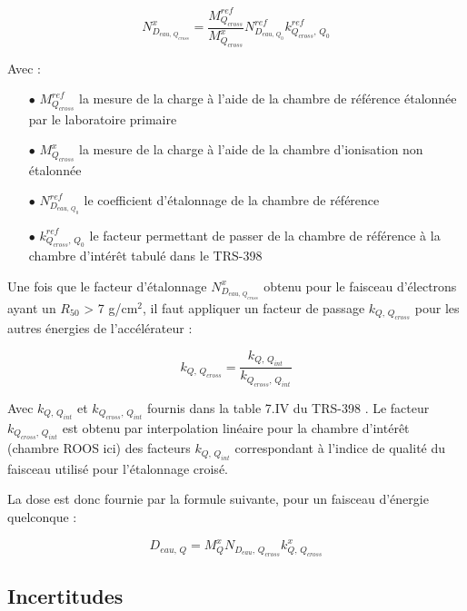 \documentclass{article}
\begin{document}
\begin{equation}
  N_{D_{eau, \, Q_{cross}}}^x = \dfrac{M_{Q_{cross}}^{ref}}{M_{Q_{cross}}^x} N_{D_{eau,\, Q_0}}^{ref} k_{Q_{cross},\, Q_0}^{ref}
  \label{eq_cross_calib}
\end{equation}

Avec :

\begin{itemize}
  \item[$\bullet$] $M_{Q_{cross}}^{ref}$ la mesure de la charge à l'aide de la chambre de référence étalonnée par le laboratoire primaire
  \item[$\bullet$] $M_{Q_{cross}}^x$ la mesure de la charge à l'aide de la chambre d'ionisation non étalonnée
  \item[$\bullet$] $N_{D_{eau,\, Q_0}}^{ref}$ le coefficient d'étalonnage de la chambre de référence
  \item[$\bullet$] $k_{Q_{cross},\, Q_0}^{ref}$ le facteur permettant de passer de la chambre de référence à la chambre d'intérêt tabulé dans le TRS-398
\end{itemize}

Une fois que le facteur d'étalonnage $N_{D_{eau, \, Q_{cross}}}^x$ obtenu pour le faisceau d'électrons ayant un $R_{50}$ > 7 g/cm$^2$, il faut appliquer un facteur de passage $k_{Q,\, Q_{cross}}$ pour les autres énergies de l'accélérateur :

\begin{equation}
  k_{Q,\, Q_{cross}} = \dfrac{k_{Q,\, Q_{int}}}{k_{Q_{cross},\, Q_{int}}}
\end{equation}

Avec $k_{Q,\, Q_{int}}$ et $k_{Q_{cross},\, Q_{int}}$ fournis dans la table 7.IV du TRS-398 \cite{international2001iaea}. Le facteur $k_{Q_{cross},\, Q_{int}}$ est obtenu par interpolation linéaire pour la chambre d'intérêt (chambre ROOS ici) des facteurs $k_{Q,\, Q_{int}}$ correspondant à l'indice de qualité du faisceau utilisé pour l'étalonnage croisé.

La dose est donc fournie par la formule suivante, pour un faisceau d'énergie quelconque :

\begin{equation}
  D_{eau,\, Q} = M_Q^x N_{D_{eau},\, Q_{cross}} k_{Q,\, Q_{cross}}^x
\end{equation}

\subsection{Incertitudes}
\end{document}
